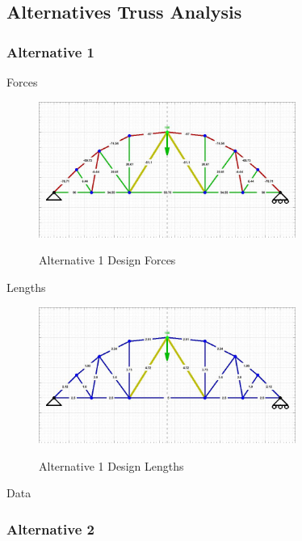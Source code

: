 \documentclass{article}
\let\Oldsubsection\subsection
\renewcommand{\subsection}{\FloatBarrier\Oldsubsection}
\let\Oldsubsubsection\subsubsection
\renewcommand{\subsubsection}{\FloatBarrier\Oldsubsubsection}
\begin{document}
\subsection{Alternatives Truss Analysis}

\subsubsection{Alternative 1}

Forces

\begin{figure}[!htb]
  \centering
  \includegraphics[width=0.75\textwidth]{assets/final_truss_2_forces.jpg}
  \label{fig:truss-forces-alt-1}
  \caption{Alternative 1 Design Forces}
\end{figure}

Lengths

\begin{figure}[!htb]
  \centering
  \includegraphics[width=0.75\textwidth]{assets/final_truss_2_lengths.jpg}
  \label{fig:truss-lengths-alt-1}
  \caption{Alternative 1 Design Lengths}
\end{figure}

\newpage

Data

\bigskip

\centering
{}

\newpage

\subsubsection{Alternative 2}
\end{document}
